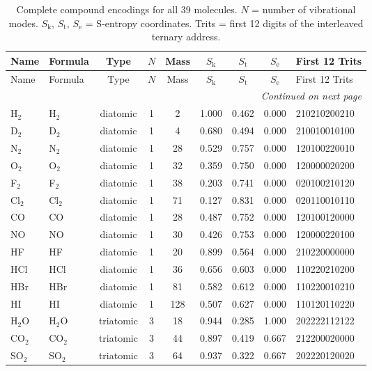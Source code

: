 \documentclass[11pt,a4paper]{article}
\theoremstyle{definition}
\theoremstyle{remark}
\newcommand{\Sk}{S_{\mathrm{k}}}
\newcommand{\St}{S_{\mathrm{t}}}
\newcommand{\Se}{S_{\mathrm{e}}}
\begin{document}
\begin{longtable}{llccccccl}
\caption{Complete compound encodings for all 39 molecules. $N$ = number of vibrational modes. $\Sk$, $\St$, $\Se$ = S-entropy coordinates. Trits = first 12 digits of the interleaved ternary address.}
\label{tab:compounds} \\
\toprule
Name & Formula & Type & $N$ & Mass & $\Sk$ & $\St$ & $\Se$ & First 12 Trits \\
\midrule
\endfirsthead
\toprule
Name & Formula & Type & $N$ & Mass & $\Sk$ & $\St$ & $\Se$ & First 12 Trits \\
\midrule
\endhead
\midrule
\multicolumn{9}{r}{\textit{Continued on next page}} \\
\bottomrule
\endfoot
\bottomrule
\endlastfoot
H$_2$    & H$_2$   & diatomic & 1 & 2   & 1.000 & 0.462 & 0.000 & 210210200210 \\
D$_2$    & D$_2$   & diatomic & 1 & 4   & 0.680 & 0.494 & 0.000 & 210010010100 \\
N$_2$    & N$_2$   & diatomic & 1 & 28  & 0.529 & 0.757 & 0.000 & 120100220010 \\
O$_2$    & O$_2$   & diatomic & 1 & 32  & 0.359 & 0.750 & 0.000 & 120000020200 \\
F$_2$    & F$_2$   & diatomic & 1 & 38  & 0.203 & 0.741 & 0.000 & 020100210120 \\
Cl$_2$   & Cl$_2$  & diatomic & 1 & 71  & 0.127 & 0.831 & 0.000 & 020110010110 \\
CO       & CO      & diatomic & 1 & 28  & 0.487 & 0.752 & 0.000 & 120100120000 \\
NO       & NO      & diatomic & 1 & 30  & 0.426 & 0.753 & 0.000 & 120000220100 \\
HF       & HF      & diatomic & 1 & 20  & 0.899 & 0.564 & 0.000 & 210220000000 \\
HCl      & HCl     & diatomic & 1 & 36  & 0.656 & 0.603 & 0.000 & 110220210200 \\
HBr      & HBr     & diatomic & 1 & 81  & 0.582 & 0.612 & 0.000 & 110220010210 \\
HI       & HI      & diatomic & 1 & 128 & 0.507 & 0.627 & 0.000 & 110120110220 \\
\midrule
H$_2$O   & H$_2$O  & triatomic & 3 & 18  & 0.944 & 0.285 & 1.000 & 202222112122 \\
CO$_2$   & CO$_2$  & triatomic & 3 & 44  & 0.897 & 0.419 & 0.667 & 212200020000 \\
SO$_2$   & SO$_2$  & triatomic & 3 & 64  & 0.937 & 0.322 & 0.667 & 202220120020 \\

\end{longtable}
\end{document}
